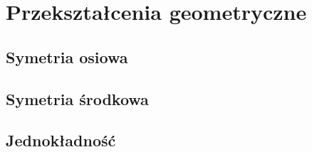 %



\section{Przekształcenia geometryczne}
\subsection{Symetria osiowa}
\subsection{Symetria środkowa}
\subsection{Jednokładność}









%